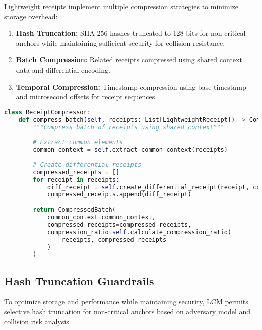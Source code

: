 \documentclass[12pt,a4paper]{article}
\begin{document}
Lightweight receipts implement multiple compression strategies to minimize storage overhead:

\begin{enumerate}
\item \textbf{Hash Truncation:} SHA-256 hashes truncated to 128 bits for non-critical anchors while maintaining sufficient security for collision resistance.

\item \textbf{Batch Compression:} Related receipts compressed using shared context data and differential encoding.

\item \textbf{Temporal Compression:} Timestamp compression using base timestamp and microsecond offsets for receipt sequences.
\end{enumerate}

\begin{lstlisting}[language=Python, caption=Receipt Compression Implementation]
class ReceiptCompressor:
    def compress_batch(self, receipts: List[LightweightReceipt]) -> CompressedBatch:
        """Compress batch of receipts using shared context"""
        
        # Extract common elements
        common_context = self.extract_common_context(receipts)
        
        # Create differential receipts
        compressed_receipts = []
        for receipt in receipts:
            diff_receipt = self.create_differential_receipt(receipt, common_context)
            compressed_receipts.append(diff_receipt)
        
        return CompressedBatch(
            common_context=common_context,
            compressed_receipts=compressed_receipts,
            compression_ratio=self.calculate_compression_ratio(
                receipts, compressed_receipts
            )
        )
\end{lstlisting}

\subsection{Hash Truncation Guardrails}

To optimize storage and performance while maintaining security, LCM permits selective hash truncation for non-critical anchors based on adversary model and collision risk analysis.
\end{document}
